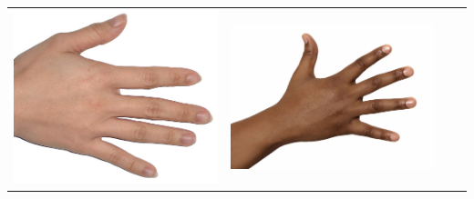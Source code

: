 \begin{longtable}{|N||c|c|c|}
\begin{minipage}{.29\textwidth}
    \includegraphics[width=\textwidth,height=\textheight,keepaspectratio]{../inputs/hand_light.jpg}
  \end{minipage} & 
  \begin{minipage}{.29\textwidth}
    \includegraphics[width=\textwidth,height=\textheight,keepaspectratio]{../inputs/hand_dark.jpg}
  \end{minipage} & 
  \begin{minipage}{.29\textwidth}

\end{minipage}
\end{longtable}
